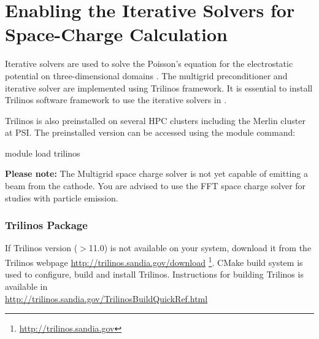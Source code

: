 \section{Enabling the Iterative Solvers for Space-Charge Calculation}

Iterative solvers are used to solve the Poisson's equation for the electrostatic potential
on three-dimensional domains \cite{Adelmann:2009p543}.
The multigrid preconditioner and iterative solver are implemented using Trilinos framework. It is essential to install
Trilinos software framework to use the iterative solvers in \opal.

Trilinos is also preinstalled on several HPC clusters including the Merlin cluster at PSI. The preinstalled version can be accessed
using the module command:
\begin{footnotesize}
\begin{example}
module load trilinos
\end{example}
\end{footnotesize}

{\bf Please note:} The Multigrid space charge solver is not yet capable of emitting a beam from the cathode.  You are advised to use the FFT space charge solver for studies with particle emission.

\subsubsection{Trilinos Package}
If Trilinos version ($>$11.0) is not available on your system, download it from the Trilinos webpage
{\url {http://trilinos.sandia.gov/download}}
\footnote{\url{http://trilinos.sandia.gov}}. CMake build system is used to configure, build and install
Trilinos. Instructions for building Trilinos is available in \\
{\url {http://trilinos.sandia.gov/TrilinosBuildQuickRef.html}}

